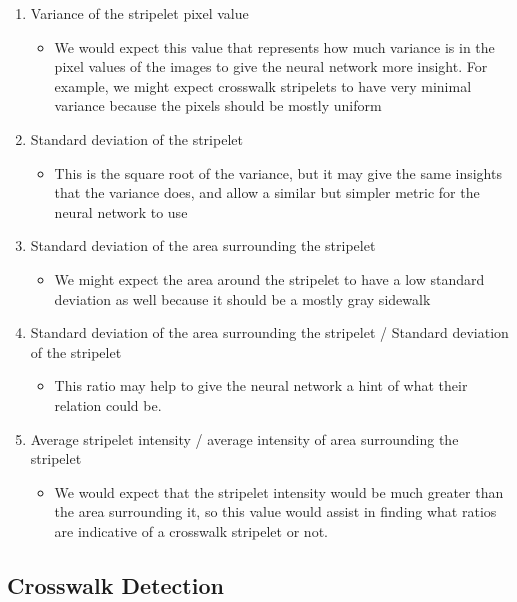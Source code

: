 \documentclass[12pt]{ucthesis}
\begin{document}
\begin{enumerate}
\begin{itemize}
   \end{itemize}
   \item Variance of the stripelet pixel value
   \begin{itemize}
     \item We would expect this value that represents how much variance is in the pixel values of the images to give the neural network more insight. For example, we might expect crosswalk stripelets to have very minimal variance because the pixels should be mostly uniform
   \end{itemize}
   \item Standard deviation of the stripelet
   \begin{itemize}
     \item This is the square root of the variance, but it may give the same insights that the variance does, and allow a similar but simpler metric for the neural network to use
   \end{itemize}
      \item Standard deviation of the area surrounding the stripelet
   \begin{itemize}
     \item We might expect the area around the stripelet to have a low standard deviation as well because it should be a mostly gray sidewalk
   \end{itemize}
      \item Standard deviation of the area surrounding the stripelet / Standard deviation of the stripelet
   \begin{itemize}
     \item This ratio may help to give the neural network a hint of what their relation could be. 
   \end{itemize}
   \item Average stripelet intensity / average intensity of area surrounding the stripelet
   \begin{itemize}
     \item We would expect that the stripelet intensity would be much greater than the area surrounding it, so this value would assist in finding what ratios are indicative of a crosswalk stripelet or not. 
   \end{itemize}
\end{enumerate}

\subsection{Crosswalk Detection}
\end{document}
